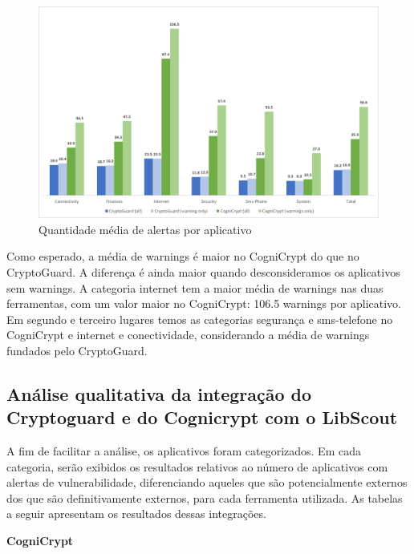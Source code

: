 \begin{figure}[!h]
    \centering
    \includegraphics[scale=0.3]{img/averageWarnings.png}
    \caption{Quantidade média de alertas por aplicativo}
    \label{averageWarnings}
\end{figure}

Como esperado, a média de warnings é maior no CogniCrypt do que no CryptoGuard. A diferença é ainda maior quando desconsideramos os aplicativos sem warnings. A categoria internet tem a maior média de warnings nas duas ferramentas, com um valor maior no CogniCrypt: 106.5 warnings por aplicativo. Em segundo e terceiro lugares temos as categorias segurança e sms-telefone no CogniCrypt e internet e conectividade, considerando a média de warnings fundados pelo CryptoGuard. \cite{perception_developers}

\subsection{Análise qualitativa da integração do Cryptoguard e do Cognicrypt com o LibScout}

A fim de facilitar a análise, os aplicativos foram categorizados. Em cada categoria, serão exibidos os resultados relativos ao número de aplicativos com alertas de vulnerabilidade, diferenciando aqueles que são potencialmente externos dos que são definitivamente externos, para cada ferramenta utilizada. As tabelas a seguir apresentam os resultados dessas integrações.

\textbf{CogniCrypt}

